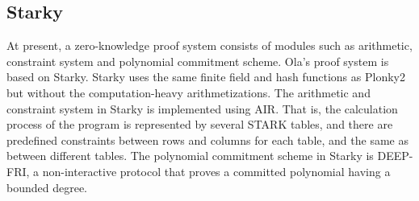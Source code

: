 \subsection{Starky}\label{section: starky-zkvm}

At present, a zero-knowledge proof system consists of modules such as arithmetic, constraint system and polynomial commitment scheme. Ola's proof system is based on Starky. Starky uses the same finite field and hash functions as Plonky2 but without the computation-heavy arithmetizations. The arithmetic and constraint system in Starky is implemented using AIR. That is, the calculation process of the program is represented by several STARK tables, and there are predefined constraints between rows and columns for each table, and the same as between different tables. The polynomial commitment scheme in Starky is DEEP-FRI, a non-interactive protocol that proves a committed polynomial having a bounded degree.






